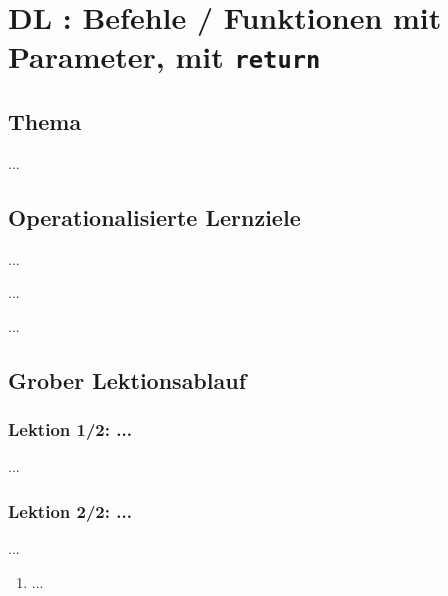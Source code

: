 \section{DL \themycounter: Befehle / Funktionen mit Parameter, mit \texorpdfstring{\lstinline|return|}{return}}

\begin{myExBox}[title=DL \themycounter]
\subsection*{Thema}
...


\subsection*{Operationalisierte Lernziele}
\begin{todolist}
    \item ...
    \item ...
    \item ...
\end{todolist}

\subsection*{Grober Lektionsablauf}
\subsubsection*{Lektion 1/2: ...}
...

\subsubsection*{Lektion 2/2: ...}
...

\begin{myExBox}[title=Mögliche Schwierigkeiten \& geeignete Massnahmen]
\begin{enumerate}
    \item ...
\end{enumerate}
\end{myExBox}
\end{myExBox}
\newpage{}

